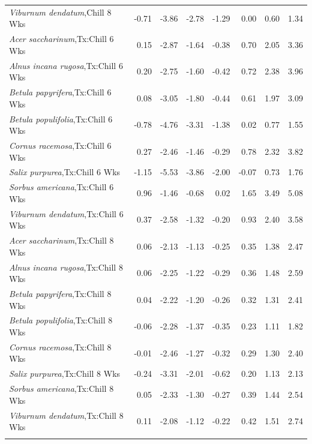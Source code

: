 \documentclass{article}\usepackage[]{graphicx}\usepackage[]{color}
\begin{document}
\begin{longtable}{lrrrrrrr}
  \textit{Viburnum dendatum},Chill 8 Wks & -0.71 & -3.86 & -2.78 & -1.29 & 0.00 & 0.60 & 1.34 \\ 
  \textit{Acer saccharinum},Tx:Chill 6 Wks & 0.15 & -2.87 & -1.64 & -0.38 & 0.70 & 2.05 & 3.36 \\ 
  \textit{Alnus incana rugosa},Tx:Chill 6 Wks & 0.20 & -2.75 & -1.60 & -0.42 & 0.72 & 2.38 & 3.96 \\ 
  \textit{Betula papyrifera},Tx:Chill 6 Wks & 0.08 & -3.05 & -1.80 & -0.44 & 0.61 & 1.97 & 3.09 \\ 
  \textit{Betula populifolia},Tx:Chill 6 Wks & -0.78 & -4.76 & -3.31 & -1.38 & 0.02 & 0.77 & 1.55 \\ 
  \textit{Cornus racemosa},Tx:Chill 6 Wks & 0.27 & -2.46 & -1.46 & -0.29 & 0.78 & 2.32 & 3.82 \\ 
  \textit{Salix purpurea},Tx:Chill 6 Wks & -1.15 & -5.53 & -3.86 & -2.00 & -0.07 & 0.73 & 1.76 \\ 
  \textit{Sorbus americana},Tx:Chill 6 Wks & 0.96 & -1.46 & -0.68 & 0.02 & 1.65 & 3.49 & 5.08 \\ 
  \textit{Viburnum dendatum},Tx:Chill 6 Wks & 0.37 & -2.58 & -1.32 & -0.20 & 0.93 & 2.40 & 3.58 \\ 
  \textit{Acer saccharinum},Tx:Chill 8 Wks & 0.06 & -2.13 & -1.13 & -0.25 & 0.35 & 1.38 & 2.47 \\ 
  \textit{Alnus incana rugosa},Tx:Chill 8 Wks & 0.06 & -2.25 & -1.22 & -0.29 & 0.36 & 1.48 & 2.59 \\ 
  \textit{Betula papyrifera},Tx:Chill 8 Wks & 0.04 & -2.22 & -1.20 & -0.26 & 0.32 & 1.31 & 2.41 \\ 
  \textit{Betula populifolia},Tx:Chill 8 Wks & -0.06 & -2.28 & -1.37 & -0.35 & 0.23 & 1.11 & 1.82 \\ 
  \textit{Cornus racemosa},Tx:Chill 8 Wks & -0.01 & -2.46 & -1.27 & -0.32 & 0.29 & 1.30 & 2.40 \\ 
  \textit{Salix purpurea},Tx:Chill 8 Wks & -0.24 & -3.31 & -2.01 & -0.62 & 0.20 & 1.13 & 2.13 \\ 
  \textit{Sorbus americana},Tx:Chill 8 Wks & 0.05 & -2.33 & -1.30 & -0.27 & 0.39 & 1.44 & 2.54 \\ 
  \textit{Viburnum dendatum},Tx:Chill 8 Wks & 0.11 & -2.08 & -1.12 & -0.22 & 0.42 & 1.51 & 2.74 \\ 
   \hline
\hline
\label{tab:suppmodchl}
\end{longtable}
\end{document}

